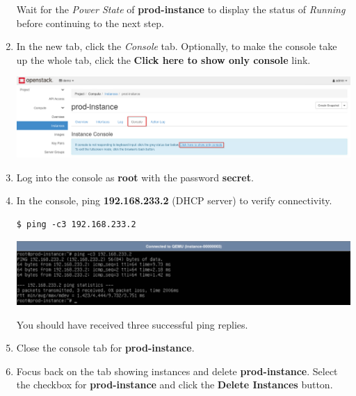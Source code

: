 \documentclass[letterpaper, 12pt]{article}
\begin{document}
\begin{enumerate}
    \begin{stopbox}
        Wait for the \textit{Power State} of \textbf{prod-instance} to display the status of \textit{Running} before
        continuing to the next step.
    \end{stopbox}

    \item In the new tab, click the \textit{Console} tab. Optionally, to make the console take up the whole tab, click
    the \textbf{Click here to show only console} link.
    
    \begin{center}
        \includegraphics[width=\linewidth]{images/part1/step10.png}
    \end{center}

    \item Log into the console as \textbf{root} with the password \textbf{secret}.

    \item In the console, ping \textbf{192.168.233.2} (DHCP server) to verify connectivity.
\begin{lstlisting}
$ ping -c3 192.168.233.2
\end{lstlisting}

    \begin{center}
        \includegraphics[width=\linewidth]{images/part1/step12.png}
    \end{center}

    \begin{notebox}
        You should have received three successful ping replies.
    \end{notebox}

    \item Close the console tab for \textbf{prod-instance}.

    \item Focus back on the tab showing instances and delete \textbf{prod-instance}. Select the checkbox for
    \textbf{prod-instance} and click the \textbf{Delete Instances} button.


\end{enumerate}
\end{document}
